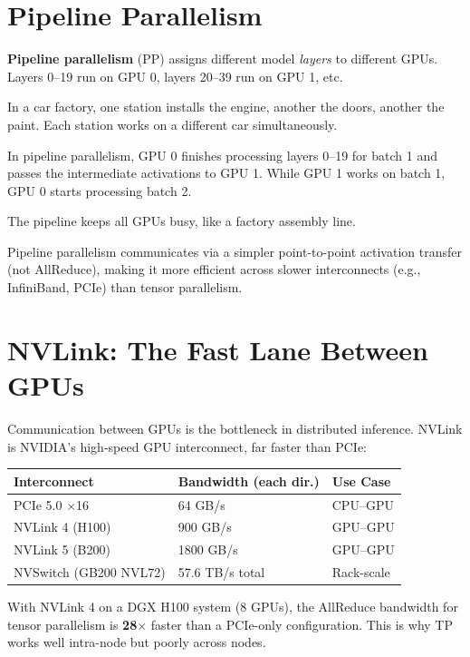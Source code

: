 \documentclass[10pt, oneside, openany]{book}
\newcommand{\analogybox}[2]{\begin{tcolorbox}[analogystyle, title={Analogy: #1}]#2\end{tcolorbox}}
\newcommand{\keyterm}[1]{\textbf{\color{AccentOrange}#1}}
\begin{document}
\section{Pipeline Parallelism}

\keyterm{Pipeline parallelism} (PP) assigns different model \textit{layers} to
different GPUs.  Layers 0--19 run on GPU 0, layers 20--39 run on GPU 1, etc.

\analogybox{The Assembly Line}{
In a car factory, one station installs the engine, another the doors, another the
paint.  Each station works on a different car simultaneously.

In pipeline parallelism, GPU 0 finishes processing layers 0--19 for batch 1 and
passes the intermediate activations to GPU 1.  While GPU 1 works on batch 1,
GPU 0 starts processing batch 2.

The pipeline keeps all GPUs busy, like a factory assembly line.
}

Pipeline parallelism communicates via a simpler point-to-point activation transfer
(not AllReduce), making it more efficient across slower interconnects
(e.g., InfiniBand, PCIe) than tensor parallelism.

\section{NVLink: The Fast Lane Between GPUs}

Communication between GPUs is the bottleneck in distributed inference.  NVLink is
NVIDIA's high-speed GPU interconnect, far faster than PCIe:

\begin{center}
\begin{tabular}{lll}
  \toprule
  \textbf{Interconnect} & \textbf{Bandwidth (each dir.)} & \textbf{Use Case} \\
  \midrule
  PCIe 5.0 $\times$16 & 64 GB/s & CPU--GPU \\
  NVLink 4 (H100) & 900 GB/s & GPU--GPU \\
  NVLink 5 (B200) & 1800 GB/s & GPU--GPU \\
  NVSwitch (GB200 NVL72) & 57.6 TB/s total & Rack-scale \\
  \bottomrule
\end{tabular}
\end{center}

With NVLink 4 on a DGX H100 system (8 GPUs), the AllReduce bandwidth for
tensor parallelism is \textbf{28$\times$} faster than a PCIe-only configuration.
This is why TP works well intra-node but poorly across nodes.
\end{document}
